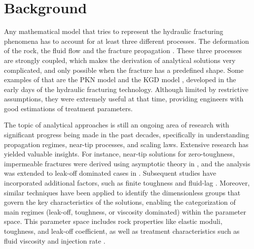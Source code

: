 \section{Background}







    Any mathematical model that tries to represent the hydraulic fracturing phenomena has to account for at least three different processes. The deformation of the rock, the fluid flow and the fracture propagation \cite{adachi2007computer}. These three processes are strongly coupled, which makes the derivation of analytical solutions very complicated, and only possible when the fracture has a predefined shape. Some examples of that are the PKN model \cite{perkins1961widths, sneddon1946opening, nordgren1972propagation} and the KGD model \cite{zheltov19553, geertsma1969rapid}, developed in the early days of the hydraulic fracturing technology. Although limited by restrictive assumptions, they were extremely useful at that time, providing engineers with good estimations of treatment parameters.


    The topic of analytical approaches is still an ongoing area of research with significant progress being made in the past decades, specifically in understanding propagation regimes, near-tip processes, and scaling laws. Extensive research has yielded valuable insights. For instance, near-tip solutions for zero-toughness, impermeable fractures were derived using asymptotic theory in \cite{desroches1994crack}, and the analysis was extended to leak-off dominated cases in \cite{lenoach1995crack}. Subsequent studies have incorporated additional factors, such as finite toughness and fluid-lag \cite{detournay2002asymptotic, detournay2003near, garagash2000tip}. Moreover, similar techniques have been applied to identify the dimensionless groups that govern the key characteristics of the solutions, enabling the categorization of main regimes (leak-off, toughness, or viscosity dominated) within the parameter space. This parameter space includes rock properties like elastic moduli, toughness, and leak-off coefficient, as well as treatment characteristics such as fluid viscosity and injection rate \cite{detournay2004propagation, adachi2002self, carbonell1999comparison, savitski2002propagation, garagash2005plane}.


